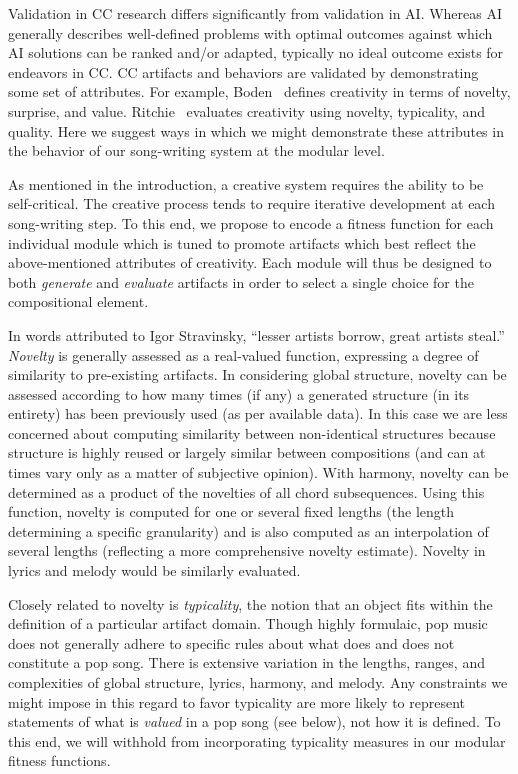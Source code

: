 \documentclass[11pt,phd]{byuprop}
\begin{document}

Validation in CC research differs significantly from validation in AI. Whereas AI generally describes well-defined problems with optimal outcomes against which AI solutions can be ranked and/or adapted, typically no ideal outcome exists for endeavors in CC. CC artifacts and behaviors are validated by demonstrating some set of attributes. For example, Boden~\cite{boden2004creative} defines creativity in terms of novelty, surprise, and value. Ritchie~\cite{ritchie2007some} evaluates creativity using novelty, typicality, and quality. Here we suggest ways in which we might demonstrate these attributes in the behavior of our song-writing system at the modular level.

As mentioned in the introduction, a creative system requires the ability to be self-critical. The creative process tends to require iterative development at each song-writing step. To this end, we propose to encode a fitness function for each individual module which is tuned to promote artifacts which best reflect the above-mentioned attributes of creativity. Each module will thus be designed to both \emph{generate} and \emph{evaluate} artifacts in order to select a single choice for the compositional element.

In words attributed to Igor Stravinsky, ``lesser artists borrow, great artists steal.'' \emph{Novelty} is generally assessed as a real-valued function, expressing a degree of similarity to pre-existing artifacts. In considering global structure, novelty can be assessed according to how many times (if any) a generated structure (in its entirety) has been previously used (as per available data). In this case we are less concerned about computing similarity between non-identical structures because structure is highly reused or largely similar between compositions (and can at times vary only as a matter of subjective opinion). With harmony, novelty can be determined as a product of the novelties of all chord subsequences. Using this function, novelty is computed for one or several fixed lengths (the length determining a specific granularity) and is also computed as an interpolation of several lengths (reflecting a more comprehensive novelty estimate). Novelty in lyrics and melody would be similarly evaluated.

Closely related to novelty is \emph{typicality}, the notion that an object fits within the definition of a particular artifact domain. Though highly formulaic, pop music does not generally adhere to specific rules about what does and does not constitute a pop song. There is extensive variation in the lengths, ranges, and complexities of global structure, lyrics, harmony, and melody. Any constraints we might impose in this regard to favor typicality are more likely to represent statements of what is \emph{valued} in a pop song (see below), not how it is defined. To this end, we will withhold from incorporating typicality measures in our modular fitness functions.
\end{document}
